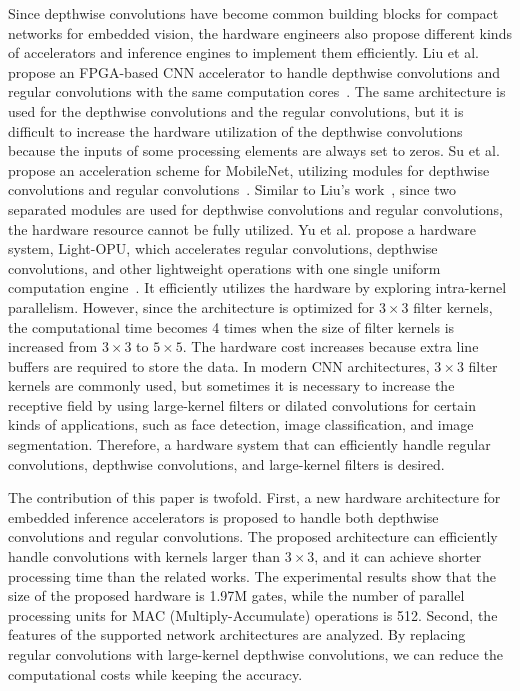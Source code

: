 \documentclass[runningheads]{llncs}
\begin{document}
Since depthwise convolutions have become common building blocks for compact networks for embedded vision, the hardware engineers also propose different kinds of accelerators and inference engines to implement them efficiently. Liu et al. propose an FPGA-based CNN accelerator to handle depthwise convolutions and regular convolutions with the same computation cores~\cite{Liu19}. The same architecture is used for the depthwise convolutions and the regular convolutions, but it is difficult to increase the hardware utilization of the depthwise convolutions because the inputs of some processing elements are always set to zeros. Su et al. propose an acceleration scheme for MobileNet, utilizing modules for depthwise convolutions and regular convolutions~\cite{Su18}. Similar to Liu's work~\cite{Liu19}, since two separated modules are used for depthwise convolutions and regular convolutions, the hardware resource cannot be fully utilized. Yu et al. propose a hardware system, Light-OPU, which accelerates regular convolutions, depthwise convolutions, and other lightweight operations with one single uniform computation engine~\cite{Yu20}. It efficiently utilizes the hardware by exploring intra-kernel parallelism. However, since the architecture is optimized for $3 \times 3$ filter kernels, the computational time becomes 4 times when the size of filter kernels is increased from $3 \times 3 $ to $5 \times 5$. The hardware cost increases because extra line buffers are required to store the data. In modern CNN architectures, $3 \times 3$ filter kernels are commonly used, but sometimes it is necessary to increase the receptive field by using large-kernel filters \cite{Peng17} or dilated convolutions \cite{Wei18,Wu19} for certain kinds of applications, such as face detection, image classification, and image segmentation. Therefore, a hardware system that can efficiently handle regular convolutions, depthwise convolutions, and large-kernel filters is desired.

The contribution of this paper is twofold. First, a new hardware architecture for embedded inference accelerators is proposed to handle both depthwise convolutions and regular convolutions. The proposed architecture can efficiently handle convolutions with kernels larger than $3 \times 3$, and it can achieve shorter processing time than the related works. The experimental results show that the size of the proposed hardware is 1.97M gates, while the number of parallel processing units for MAC (Multiply-Accumulate) operations is 512. Second, the features of the supported network architectures are analyzed. By replacing regular convolutions with large-kernel depthwise convolutions, we can reduce the computational costs while keeping the accuracy.
\end{document}
